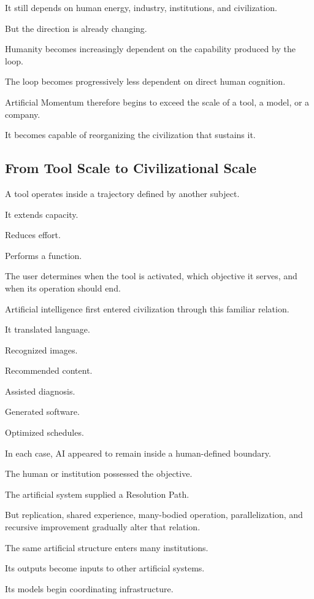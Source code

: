 It still depends on human energy, industry, institutions, and civilization.

But the direction is already changing.

Humanity becomes increasingly dependent on the capability produced by the loop.

The loop becomes progressively less dependent on direct human cognition.

Artificial Momentum therefore begins to exceed the scale of a tool, a model, or a company.

It becomes capable of reorganizing the civilization that sustains it.

\subsection*{\textbf{From Tool Scale to Civilizational Scale}} 

A tool operates inside a trajectory defined by another subject.

It extends capacity.

Reduces effort.

Performs a function.

The user determines when the tool is activated, which objective it serves, and when its operation should end.

Artificial intelligence first entered civilization through this familiar relation.

It translated language.

Recognized images.

Recommended content.

Assisted diagnosis.

Generated software.

Optimized schedules.

In each case, AI appeared to remain inside a human-defined boundary.

The human or institution possessed the objective.

The artificial system supplied a Resolution Path.

But replication, shared experience, many-bodied operation, parallelization, and recursive improvement gradually alter that relation.

The same artificial structure enters many institutions.

Its outputs become inputs to other artificial systems.

Its models begin coordinating infrastructure.


